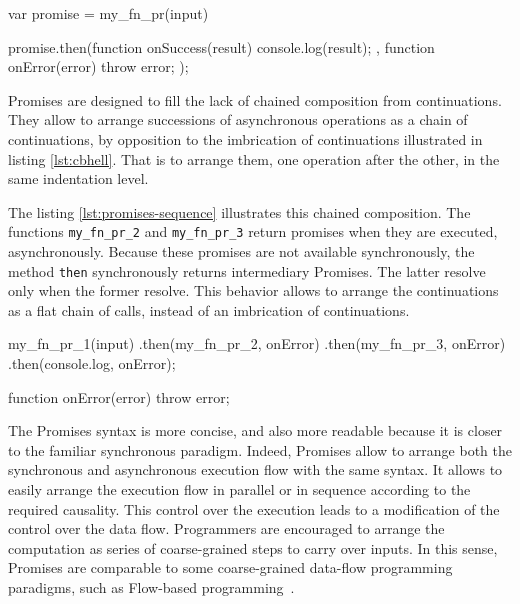 \begin{code}[js, %
             caption={Example of a promise}, %
             label={lst:then}] %
var promise = my_fn_pr(input)

promise.then(function onSuccess(result) {
  console.log(result);
}, function onError(error) {
  throw error;
});
\end{code}

Promises are designed to fill the lack of chained composition from continuations.
They allow to arrange successions of asynchronous operations as a chain of continuations, by opposition to the imbrication of continuations illustrated in listing \ref{lst:cbhell}.
That is to arrange them, one operation after the other, in the same indentation level.

The listing \ref{lst:promises-sequence} illustrates this chained composition.
The functions \texttt{my\_fn\_pr\_2} and \texttt{my\_fn\_pr\_3} return promises when they are executed, asynchronously.
Because these promises are not available synchronously, the method \texttt{then} synchronously returns intermediary Promises.
The latter resolve only when the former resolve.
This behavior allows to arrange the continuations as a flat chain of calls, instead of an imbrication of continuations.

\begin{code}[js, %
             caption={A chain of Promises is more concise than an imbrication of continuations}, %
             label={lst:promises-sequence}] %
my_fn_pr_1(input)
.then(my_fn_pr_2, onError)
.then(my_fn_pr_3, onError)
.then(console.log, onError);

function onError(error) {
  throw error;
}
\end{code}

The Promises syntax is more concise, and also more readable because it is closer to the familiar synchronous paradigm.
Indeed, Promises allow to arrange both the synchronous and asynchronous execution flow with the same syntax.
It allows to easily arrange the execution flow in parallel or in sequence according to the required causality.
This control over the execution leads to a modification of the control over the data flow.
Programmers are encouraged to arrange the computation as series of coarse-grained steps to carry over inputs.
In this sense, Promises are comparable to some coarse-grained data-flow programming paradigms, such as Flow-based programming~\cite{Morrison1994}.

